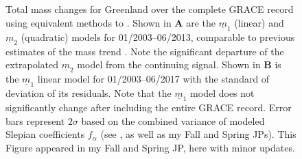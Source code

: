 \documentclass[12pt]{article}
\begin{document}
\begin{figure}[h!]
\centering
{}
\caption[Greenland Mass Trend: 2003--2017]{Total mass changes for Greenland over the complete GRACE record using equivalent methods to \cite{Harig+2016}. Shown in \textbf{A} are the $\underline{m}_1$ (linear) and $\underline{m}_2$ (quadratic) models for 01/2003--06/2013, comparable to previous estimates of the mass trend \citep{Harig+2016}. Note the significant departure of the extrapolated $\underline{m}_2$ model from the continuing signal. Shown in \textbf{B} is the $\underline{m}_1$ linear model for 01/2003--06/2017 with the standard of deviation of its residuals. Note that the $\underline{m}_1$ model does not significantly change after including the entire GRACE record. Error bars represent $2\sigma$ based on the combined variance of modeled Slepian coefficients $f_{\alpha}$ (see \cite{Harig+2016}, as well as my Fall and Spring JPs). This Figure appeared in my Fall and Spring JP, here with minor updates.} \label{fig:Getraer}
\end{figure}
\end{document}
